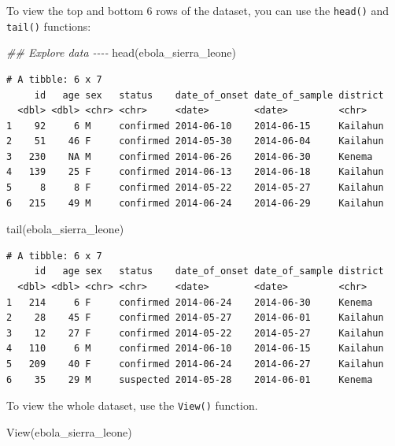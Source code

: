\documentclass[
  letterpaper,
  DIV=11,
  numbers=noendperiod]{scrreprt}
\newenvironment{Shaded}{\begin{snugshade}}{\end{snugshade}}
\newcommand{\DocumentationTok}[1]{\textcolor[rgb]{0.37,0.37,0.37}{\textit{#1}}}
\newcommand{\FunctionTok}[1]{\textcolor[rgb]{0.28,0.35,0.67}{#1}}
\newcommand{\NormalTok}[1]{\textcolor[rgb]{0.00,0.23,0.31}{#1}}
\begin{document}
To view the top and bottom 6 rows of the dataset, you can use the
\texttt{head()} and \texttt{tail()} functions:

\begin{Shaded}
\begin{Highlighting}[]
\DocumentationTok{\#\# Explore data {-}{-}{-}{-}}
\FunctionTok{head}\NormalTok{(ebola\_sierra\_leone)}
\end{Highlighting}
\end{Shaded}

\begin{verbatim}
# A tibble: 6 x 7
     id   age sex   status    date_of_onset date_of_sample district
  <dbl> <dbl> <chr> <chr>     <date>        <date>         <chr>   
1    92     6 M     confirmed 2014-06-10    2014-06-15     Kailahun
2    51    46 F     confirmed 2014-05-30    2014-06-04     Kailahun
3   230    NA M     confirmed 2014-06-26    2014-06-30     Kenema  
4   139    25 F     confirmed 2014-06-13    2014-06-18     Kailahun
5     8     8 F     confirmed 2014-05-22    2014-05-27     Kailahun
6   215    49 M     confirmed 2014-06-24    2014-06-29     Kailahun
\end{verbatim}

\begin{Shaded}
\begin{Highlighting}[]
\FunctionTok{tail}\NormalTok{(ebola\_sierra\_leone)}
\end{Highlighting}
\end{Shaded}

\begin{verbatim}
# A tibble: 6 x 7
     id   age sex   status    date_of_onset date_of_sample district
  <dbl> <dbl> <chr> <chr>     <date>        <date>         <chr>   
1   214     6 F     confirmed 2014-06-24    2014-06-30     Kenema  
2    28    45 F     confirmed 2014-05-27    2014-06-01     Kailahun
3    12    27 F     confirmed 2014-05-22    2014-05-27     Kailahun
4   110     6 M     confirmed 2014-06-10    2014-06-15     Kailahun
5   209    40 F     confirmed 2014-06-24    2014-06-27     Kailahun
6    35    29 M     suspected 2014-05-28    2014-06-01     Kenema  
\end{verbatim}

To view the whole dataset, use the \texttt{View()} function.

\begin{Shaded}
\begin{Highlighting}[]
\FunctionTok{View}\NormalTok{(ebola\_sierra\_leone)}
\end{Highlighting}
\end{Shaded}
\end{document}
